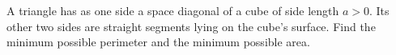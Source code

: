 A triangle has as one side a space diagonal of a cube of side length $a>0$. Its other two sides are straight segments lying on the cube's surface. Find the minimum possible perimeter and the minimum possible area.
